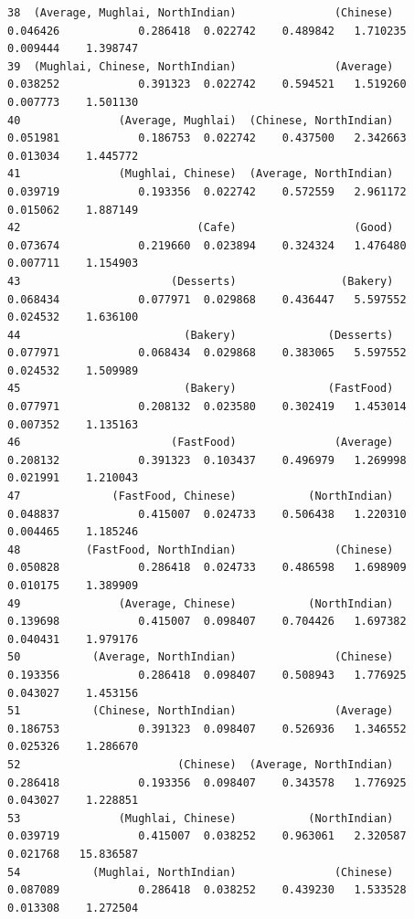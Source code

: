 \documentclass[11pt]{article} %
\begin{document}
\begin{lstlisting}
38  (Average, Mughlai, NorthIndian)               (Chinese)            0.046426            0.286418  0.022742    0.489842   1.710235  0.009444    1.398747
39  (Mughlai, Chinese, NorthIndian)               (Average)            0.038252            0.391323  0.022742    0.594521   1.519260  0.007773    1.501130
40               (Average, Mughlai)  (Chinese, NorthIndian)            0.051981            0.186753  0.022742    0.437500   2.342663  0.013034    1.445772
41               (Mughlai, Chinese)  (Average, NorthIndian)            0.039719            0.193356  0.022742    0.572559   2.961172  0.015062    1.887149
42                           (Cafe)                  (Good)            0.073674            0.219660  0.023894    0.324324   1.476480  0.007711    1.154903
43                       (Desserts)                (Bakery)            0.068434            0.077971  0.029868    0.436447   5.597552  0.024532    1.636100
44                         (Bakery)              (Desserts)            0.077971            0.068434  0.029868    0.383065   5.597552  0.024532    1.509989
45                         (Bakery)              (FastFood)            0.077971            0.208132  0.023580    0.302419   1.453014  0.007352    1.135163
46                       (FastFood)               (Average)            0.208132            0.391323  0.103437    0.496979   1.269998  0.021991    1.210043
47              (FastFood, Chinese)           (NorthIndian)            0.048837            0.415007  0.024733    0.506438   1.220310  0.004465    1.185246
48          (FastFood, NorthIndian)               (Chinese)            0.050828            0.286418  0.024733    0.486598   1.698909  0.010175    1.389909
49               (Average, Chinese)           (NorthIndian)            0.139698            0.415007  0.098407    0.704426   1.697382  0.040431    1.979176
50           (Average, NorthIndian)               (Chinese)            0.193356            0.286418  0.098407    0.508943   1.776925  0.043027    1.453156
51           (Chinese, NorthIndian)               (Average)            0.186753            0.391323  0.098407    0.526936   1.346552  0.025326    1.286670
52                        (Chinese)  (Average, NorthIndian)            0.286418            0.193356  0.098407    0.343578   1.776925  0.043027    1.228851
53               (Mughlai, Chinese)           (NorthIndian)            0.039719            0.415007  0.038252    0.963061   2.320587  0.021768   15.836587
54           (Mughlai, NorthIndian)               (Chinese)            0.087089            0.286418  0.038252    0.439230   1.533528  0.013308    1.272504

\end{lstlisting}
\end{document}
